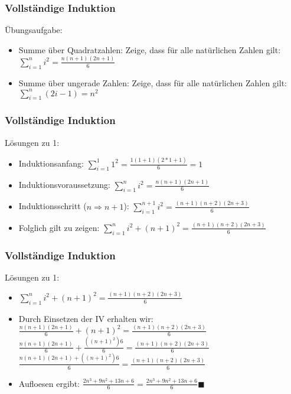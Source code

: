\begin{frame}
    \frametitle{Vollständige Induktion}
    Übungsaufgabe:
        \begin{itemize}

    \vfill \item Summe über Quadratzahlen: Zeige, dass für alle natürlichen Zahlen gilt:
    \newline $\sum_{i=1}^{n} i^2 = \frac{n(n+1)(2n+1)}{6}$
     \vfill \item Summe über ungerade Zahlen: Zeige, dass für alle natürlichen Zahlen gilt:
    \newline $\sum_{i=1}^{n} (2i-1) = n^2$
    \end{itemize}

\end{frame}

\begin{frame}
    \frametitle{Vollständige Induktion}
    Lösungen zu 1:
        \begin{itemize}

    \vfill \item Induktionsanfang:
    \newline $\sum_{i=1}^{1} 1^2 = \frac{1(1+1)(2*1+1)}{6}=1$
    \newline \item Induktionsvoraussetzung:
    \newline $\sum_{i=1}^{n} i^2 = \frac{n(n+1)(2n+1)}{6}$
        \vfill \item Induktionsschritt ($n \Rightarrow n+1$):
    \newline $\sum_{i=1}^{n+1} i^2 = \frac{(n+1)(n+2)(2n+3)}{6}$
            \vfill \item Folglich gilt zu zeigen:
	\newline$\sum_{i=1}^{n} i^2 + (n+1)^2 = \frac{(n+1)(n+2)(2n+3)}{6}$
    \end{itemize}

\end{frame}

\begin{frame}
    \frametitle{Vollständige Induktion}
    Lösungen zu 1:
        \begin{itemize}
            \vfill \item $\sum_{i=1}^{n} i^2 + (n+1)^2 = \frac{(n+1)(n+2)(2n+3)}{6}$
            \vfill \item Durch Einsetzen der IV erhalten wir:
            \newline $\frac{n(n+1)(2n+1)}{6} + (n+1)^2 = \frac{(n+1)(n+2)(2n+3)}{6} $
            \newline $\frac{n(n+1)(2n+1)}{6} + \frac{((n+1)^2)6}{6} = \frac{(n+1)(n+2)(2n+3)}{6}$
            \newline$\frac{n(n+1)(2n+1) + ((n+1)^2)6}{6} = \frac{(n+1)(n+2)(2n+3)}{6}$
            \vfill \item Aufloesen ergibt:
            \newline $\frac{2n^3 + 9n^2 + 13n + 6}{6} = \frac{2n^3 + 9n^2 + 13n + 6}{6} \blacksquare$
        \end{itemize}

\end{frame}

